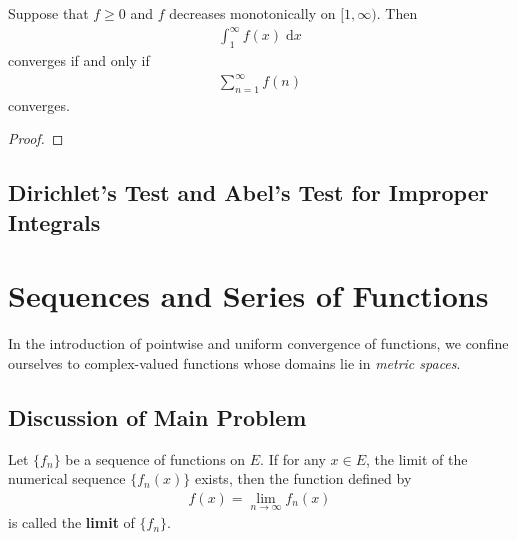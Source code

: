 \documentclass[thmcnt=section, 12pt]{elegantbook}
\begin{document}

\begin{theorem} \label{thm:22}
    Suppose that $f \geq 0$ and $f$ decreases monotonically on $[1, \infty)$. Then 
    \begin{align*}
        \int_1^\infty f(x) \; \mathrm{d}x
    \end{align*}
    converges if and only if 
    \begin{align*}
        \sum_{n=1}^\infty f(n)
    \end{align*}
    converges.
\end{theorem}

\begin{proof}
\end{proof}


\section{Dirichlet's Test and Abel's Test for Improper Integrals}



\chapter{Sequences and Series of Functions}

\par In the introduction of pointwise and uniform convergence of functions, we confine ourselves to complex-valued functions whose domains lie in \textit{metric spaces}.


\section{Discussion of Main Problem}


\begin{definition} \label{def:1}
    Let $\{f_n\}$ be a sequence of functions on $E$. If for any $x \in E$, the limit of the numerical sequence $\{f_n(x)\}$ exists, then the function defined by
    \begin{align*}
        f(x) = \lim_{n \to \infty} f_n(x)
    \end{align*}
    is called the \textbf{limit} of $\{f_n\}$.
\end{definition}
\end{document}
